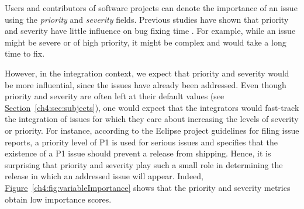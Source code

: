 \noindent\DIFdelbegin \textit{\textbf{}%
} %
\DIFdelend \DIFaddbegin {} \DIFaddend Users and contributors of software
projects can denote the importance of an issue using the \textit{priority} and
\textit{severity} fields. Previous studies have shown that priority and
severity have little influence on bug fixing time
\cite{tian2015unreliability,Herraiz2008,Mockus:2002}. For example, while an
issue might be severe or of high priority, it might be complex and would take a
long time to fix.  

However, in the integration context, we expect that priority and severity would
be more influential, since the issues have already been addressed. Even though
priority and severity are often left at their default values (see
\hyperref[ch4:sec:subjects]{Section}~\ref{ch4:sec:subjects}), one would expect that the
integrators would fast-track the integration of issues for which they
care about increasing the levels of severity or priority. For instance,
according to the Eclipse project guidelines for filing issue reports, a priority
level of P1 is used for serious issues and specifies that the existence of a P1
issue should prevent a release from
shipping.
Hence, it is surprising that priority and severity play such a small role in
determining the release in which an addressed issue will appear. Indeed,
\hyperref[ch4:fig:variableImportance]{Figure}~\ref{ch4:fig:variableImportance} shows
that the priority and severity metrics obtain low importance scores.

